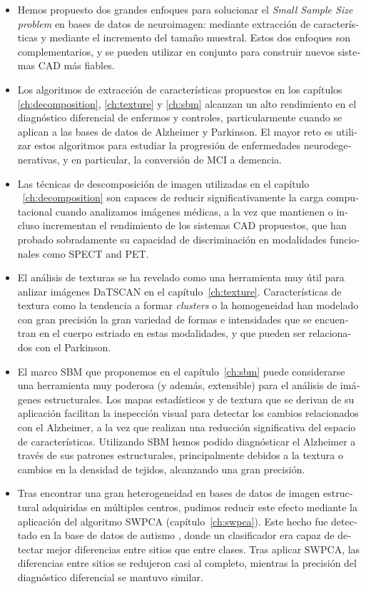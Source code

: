 \begin{otherlanguage}{spanish}
\begin{itemize}
	\item Hemos propuesto dos grandes enfoques para solucionar el \textit{Small Sample Size problem} en bases de datos de neuroimagen: mediante extracción de características y mediante el incremento del tamaño muestral. Estos dos enfoques son complementarios, y se pueden utilizar en conjunto para construir nuevos sistemas \ac{CAD} más fiables. 
	\item Los algoritmos de extracción de características propuestos en los capítulos  \ref{ch:decomposition}, \ref{ch:texture} y \ref{ch:sbm} alcanzan un alto rendimiento en el diagnóstico diferencial de enfermos y controles, particularmente cuando se aplican a las bases de datos de Alzheimer y Parkinson. El mayor reto es utilizar estos algoritmos para estudiar la progresión de enfermedades neurodegenerativas, y en particular, la conversión de \ac{MCI} a demencia. 
	\item Las técnicas de descomposición de imagen utilizadas en el capítulo ~\ref{ch:decomposition} son capaces de reducir significativamente la carga computacional cuando analizamos imágenes médicas, a la vez que mantienen o incluso incrementan el rendimiento de los sistemas \ac{CAD} propuestos, que han probado sobradamente su capacidad de discriminación en modalidades funcionales como \acs{SPECT} and \acs{PET}. 
	\item El análisis de texturas se ha revelado como una herramienta muy útil para anlizar imágenes DaTSCAN en el capítulo~\ref{ch:texture}. Características de textura como la tendencia a formar \textit{clusters} o la homogeneidad han modelado con gran precisión la gran variedad de formas e intensidades que se encuentran en el cuerpo estriado en estas modalidades, y que pueden ser relacionados con el Parkinson.  
	\item El marco \ac{SBM} que proponemos en el capítulo~\ref{ch:sbm} puede considerarse una herramienta muy poderosa (y además, extensible) para el análisis de imágenes estructurales. Los mapas estadísticos y de textura que se derivan de su aplicación facilitan la inspección visual para detectar los cambios relacionados con el Alzheimer, a la vez que realizan una reducción significativa del espacio de características. Utilizando \ac{SBM} hemos podido diagnósticar el Alzheimer a través de sus patrones estructurales, principalmente debidos a la textura o cambios en la densidad de tejidos, alcanzando una gran precisión. 
	\item Tras encontrar una gran heterogeneidad en bases de datos de imagen estructural adquiridas en múltiples centros, pudimos reducir este efecto mediante la aplicación del algoritmo \ac{SWPCA} (capítulo~\ref{ch:swpca}). Este hecho fue detectado en la base de datos de autismo \aimsmri{}, donde un clasificador era capaz de detectar mejor diferencias entre sitios que entre clases. Tras aplicar \ac{SWPCA}, las diferencias entre sitios se redujeron casi al completo, mientras la precisión del diagnóstico diferencial se mantuvo similar. 

\end{itemize}
\end{otherlanguage}
